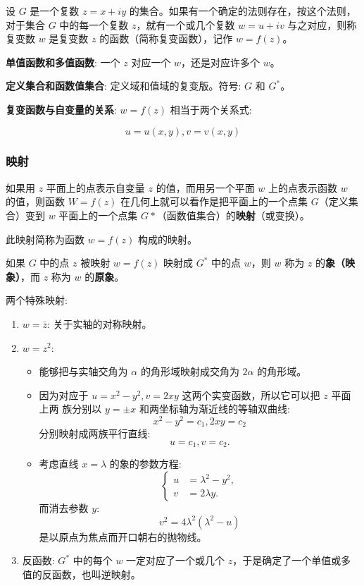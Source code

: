 设 \(G\) 是一个复数 \(z = x + iy\)
的集合。如果有一个确定的法则存在，按这个法则，对于集合 \(G\)
中的每一个复数 \(z\)，就有一个或几个复数 \(w = u + iv\)
与之对应，则称复变数 \(w\) 是复变数 \(z\) 的函数（简称复变函数），记作
\(w = f(z)\)。

\textbf{单值函数和多值函数}:  一个 \(z\) 对应一个 \(w\)，还是对应许多个 \(w\)。

\textbf{定义集合和函数值集合}:  定义域和值域的复变版。符号: \(G\) 和 \(G^*\)。

\textbf{复变函数与自变量的关系}:  \(w=f(z)\) 相当于两个关系式:

\begin{equation*}
u=u(x,y),v=v(x,y)
\end{equation*}
\subsubsection{映射}
\label{映射}
如果用 \(z\) 平面上的点表示自变量 \(z\) 的值，而用另一个平面 \(w\)
上的点表示函数 \(w\) 的值，则函数 \(W=f(z)\)
在几何上就可以看作是把平面上的一个点集 \(G\)（定义集合）变到 \(w\)
平面上的一个点集 \(G*\)（函数值集合）的\textbf{映射}（或变换）。

此映射简称为函数 \(w=f(z)\) 构成的映射。

如果 \(G\) 中的点 \(z\) 被映射 \(w = f(z)\) 映射成 \(G^*\) 中的点
\(w\)，则 \(w\) 称为 \(z\) 的\textbf{象（映象）}，而 \(z\) 称为 \(w\)
的\textbf{原象}。

两个特殊映射:

\begin{enumerate}
\item \(w=\bar{z}\): 关于实轴的对称映射。
\item \(w=z^2\):
\begin{itemize}
\item 能够把与实轴交角为 \(\alpha\) 的角形域映射成交角为 \(2\alpha\)
的角形域。
\item 因为对应于 \(u=x^2-y^2,v=2xy\) 这两个实变函数，所以它可以把 \(z\) 平面上两
族分别以 \(y=\pm x\) 和两坐标轴为渐近线的等轴双曲线:
\begin{equation*}
x^2-y^2=c_1,2xy=c_2
\end{equation*}
分别映射成两族平行直线:
\begin{equation*}
u=c_1,v=c_2.
\end{equation*}
\item 考虑直线 \(x=\lambda\) 的象的参数方程:
\begin{equation*}
\begin{cases}
u &= \lambda^2-y^2,\\
v &=2\lambda y.
\end{cases}
\end{equation*}
而消去参数 \(y\):
\begin{equation*}
v^2=4\lambda^2(\lambda^2-u)
\end{equation*}
是以原点为焦点而开口朝右的抛物线。
\end{itemize}
\item 反函数: \(G^*\) 中的每个 \(w\) 一定对应了一个或几个
\(z\)，于是确定了一个单值或多值的反函数，也叫逆映射。
\end{enumerate}

